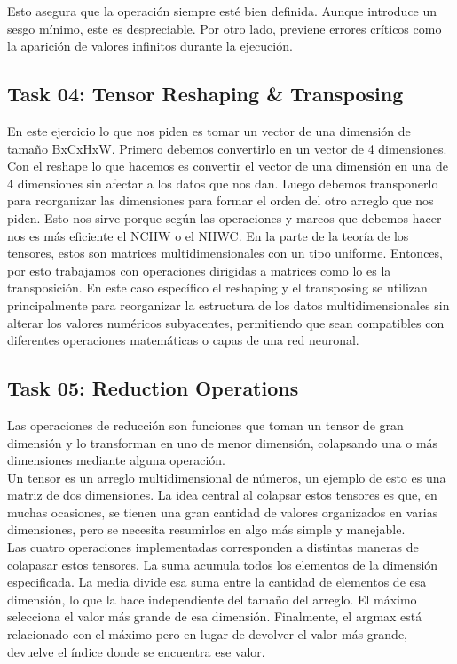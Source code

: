 \documentclass[12pt]{article}
\begin{document}
Esto asegura que la operación siempre esté bien definida. Aunque introduce un sesgo mínimo, este es despreciable. Por otro lado, previene errores críticos como la aparición de valores infinitos durante la ejecución.


\subsection*{Task 04: Tensor Reshaping \& Transposing}
En este ejercicio lo que nos piden es tomar un vector de una dimensión de tamaño BxCxHxW.
Primero debemos convertirlo en un vector de 4 dimensiones. Con el reshape lo que hacemos es convertir el vector de una dimensión en una de 4 dimensiones sin afectar a los datos que nos dan.
Luego debemos transponerlo para reorganizar las dimensiones para formar el orden del otro arreglo que nos piden.
Esto nos sirve porque según las operaciones y marcos que debemos hacer nos es más eficiente el NCHW o el NHWC.
En la parte de la teoría de los tensores, estos son matrices multidimensionales con un tipo uniforme. Entonces, por esto trabajamos con operaciones dirigidas a matrices como lo es la transposición. En este caso específico el reshaping y el transposing se utilizan principalmente para reorganizar la estructura de los datos multidimensionales sin alterar los valores numéricos subyacentes, permitiendo que sean compatibles con diferentes operaciones matemáticas o capas de una red neuronal. 


\subsection*{Task 05: Reduction Operations}
Las operaciones de reducción son funciones que toman un tensor de gran dimensión
y lo transforman en uno de menor dimensión, colapsando una o más dimensiones mediante alguna operación. \\
Un tensor es un arreglo multidimensional de números, un ejemplo de esto es una matriz de dos dimensiones. 
La idea central al colapsar estos tensores es que, en muchas ocasiones, se tienen una gran cantidad de valores
organizados en varias dimensiones, pero se necesita resumirlos en algo más simple y manejable. \\
Las cuatro operaciones implementadas corresponden a distintas maneras de colapasar estos tensores. La suma acumula
todos los elementos de la dimensión especificada. La media divide esa suma entre la cantidad de elementos de esa dimensión, lo que la hace
independiente del tamaño del arreglo. El máximo selecciona el valor más grande de esa dimensión. Finalmente, el argmax está relacionado
con el máximo pero en lugar de devolver el valor más grande, devuelve el índice donde se encuentra ese valor. \\
\end{document}
